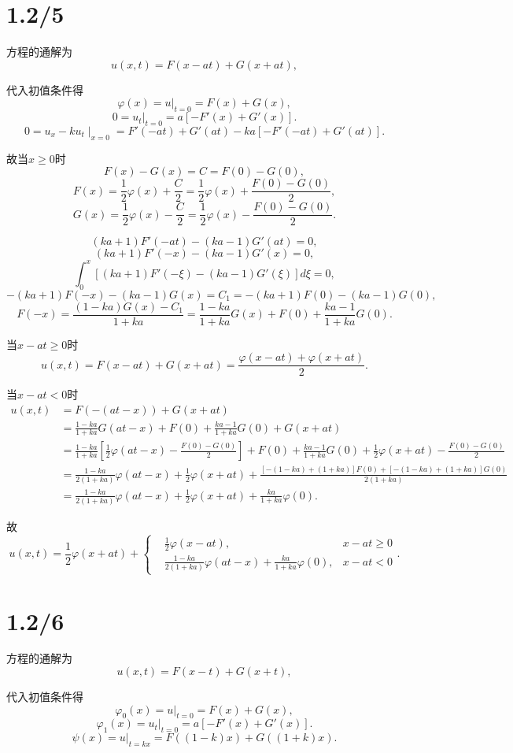 \documentclass[11pt,a4paper]{article}
\begin{document}
\section{1.2/5}
方程的通解为
$$u(x,t)=F(x-at)+G(x+at),$$

代入初值条件得
$$\varphi(x)=u|_{t=0}=F(x)+G(x),$$
$$0=u_t|_{t=0}=a[-F'(x)+G'(x)].$$
$$0=u_x-ku_t\mid_{x=0}=F'(-at)+G'(at)-ka[-F'(-at)+G'(at)].$$

故当$x\geqslant 0$时
$$F(x)-G(x)=C=F(0)-G(0),$$
$$F(x)=\frac{1}{2}\varphi(x)+\frac{C}{2}=\frac{1}{2}\varphi(x)+\frac{F(0)-G(0)}{2},$$
$$G(x)=\frac{1}{2}\varphi(x)-\frac{C}{2}=\frac{1}{2}\varphi(x)-\frac{F(0)-G(0)}{2}.$$

$$(ka+1)F'(-at)-(ka-1)G'(at)=0,$$
$$(ka+1)F'(-x)-(ka-1)G'(x)=0,$$
$$\int_0^x[(ka+1)F'(-\xi)-(ka-1)G'(\xi)]d\xi=0,$$
$$-(ka+1)F(-x)-(ka-1)G(x)=C_1=-(ka+1)F(0)-(ka-1)G(0),$$
$$F(-x)=\frac{(1-ka)G(x)-C_1}{1+ka}=\frac{1-ka}{1+ka}G(x)+F(0)+\frac{ka-1}{1+ka}G(0).$$

当$x-at\geqslant 0$时
$$u(x,t)=F(x-at)+G(x+at)=\frac{\varphi(x-at)+\varphi(x+at)}{2}.$$

当$x-at<0$时
\begin{align*}
u(x,t)&=F(-(at-x))+G(x+at)\\
&=\frac{1-ka}{1+ka}G(at-x)+F(0)+\frac{ka-1}{1+ka}G(0)+G(x+at)\\
&=\frac{1-ka}{1+ka}\left[\frac{1}{2}\varphi(at-x)-\frac{F(0)-G(0)}{2}\right]+F(0)+\frac{ka-1}{1+ka}G(0)+\frac{1}{2}\varphi(x+at)-\frac{F(0)-G(0)}{2}\\
&=\frac{1-ka}{2(1+ka)}\varphi(at-x)+\frac{1}{2}\varphi(x+at)+\frac{[-(1-ka)+(1+ka)]F(0)+[-(1-ka)+(1+ka)]G(0)}{2(1+ka)}\\
&=\frac{1-ka}{2(1+ka)}\varphi(at-x)+\frac{1}{2}\varphi(x+at)+\frac{ka}{1+ka}\varphi(0).
\end{align*}

故
$$u(x,t)=\frac{1}{2}\varphi(x+at)+\left\{\begin{aligned}
&\frac{1}{2}\varphi(x-at), & x-at\geqslant 0\\
&\frac{1-ka}{2(1+ka)}\varphi(at-x)+\frac{ka}{1+ka}\varphi(0), & x-at<0
\end{aligned}\right..$$

\section{1.2/6}

方程的通解为
$$u(x,t)=F(x-t)+G(x+t),$$

代入初值条件得
$$\varphi_0(x)=u|_{t=0}=F(x)+G(x),$$
$$\varphi_1(x)=u_t|_{t=0}=a[-F'(x)+G'(x)].$$
$$\psi(x)=u|_{t=kx}=F((1-k)x)+G((1+k)x).$$
\end{document}
